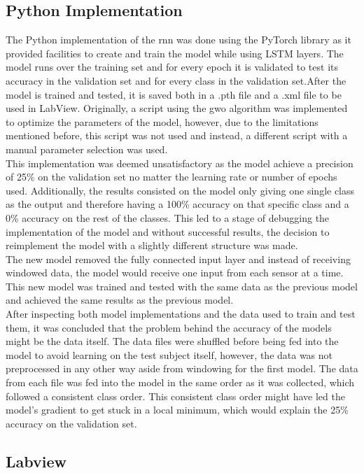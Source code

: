 \subsection{Python Implementation}
The Python implementation of the \acrshort{rnn} was done using the PyTorch library as it provided facilities 
to create and train the model while using LSTM layers. The model runs over the training set and for every epoch
it is validated to test its accuracy in the validation set and for every class in the validation set.After the model is trained 
and tested, it is saved both in a .pth file and a .xml file to be used in LabView.
Originally, a script using the \acrshort{gwo} algorithm was implemented 
to optimize the parameters of the model, however, due to the limitations mentioned before, this script was not 
used and instead, a different script with a manual parameter selection was used.
\\
This implementation was deemed unsatisfactory as the model achieve a precision of 25\% on the validation set no matter the
learning rate or number of epochs used. Additionally, the results consisted on the model only giving one single class as the output
and therefore having a 100\% accuracy on that specific class and a 0\% accuracy on the rest of the classes. 
This led to a stage of debugging the implementation of the model and without successful results, the decision to reimplement 
the model with a slightly different structure was made.
\\
The new model removed the fully connected input layer and instead of receiving windowed data, the model would receive one input
from each sensor at a time. This new model was trained and tested with the same data as the previous model and achieved the same results
as the previous model.
\\
After inspecting both model implementations and the data used to train and test them, it was concluded that the problem behind the accuracy
of the models might be the data itself. The data files were shuffled before being fed into the model to avoid learning on the test subject
itself, however, the data was not preprocessed in any other way aside from windowing for the first model. The data from each file was fed
into the model in the same order as it was collected, which followed a consistent class order. This consistent class order might have led
the model's gradient to get stuck in a local minimum, which would explain the 25\% accuracy on the validation set.

\subsection{Labview}

